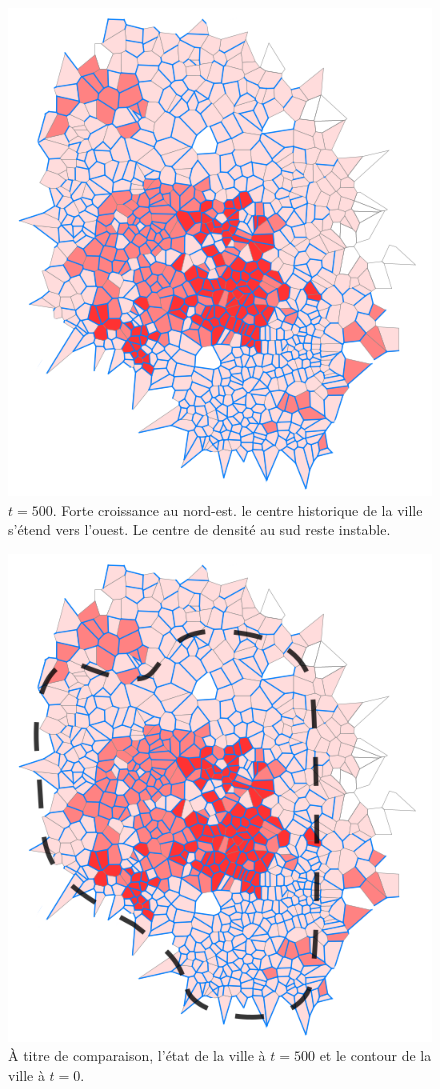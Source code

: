 \documentclass[12pt]{article}
\begin{document}
\begin{figure}[H]
  \centering
  \includegraphics[width=.8\linewidth]{images/lh_500.png}
  \caption{$t = 500$. Forte croissance au nord-est. le centre
    historique de la ville s'étend vers l'ouest. Le centre de densité
    au sud reste instable.}
\end{figure}

\begin{figure}[H]
  \centering
  \includegraphics[width=.8\linewidth]{images/lh_500_comparison.png}
  \caption{À titre de comparaison, l'état de la ville à $t = 500$ et
    le contour de la ville à $t = 0$.}
\end{figure}
\end{document}
